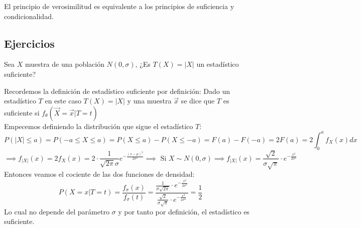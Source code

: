 \begin{teorema}
	El principio de verosimilitud es equivalente a los principios de suficiencia y condicionalidad.
\end{teorema}  

\subsection{Ejercicios}
\begin{problem}{2.1}
	Sea $X$ muestra de una población $N(0, \sigma)$, ¿Es $T(X) = |X|$ un estadístico suficiente?
\end{problem}
\begin{sol}
	Recordemos la definición de estadístico suficiente por definición: Dado un estadístico $T$ en este caso $T(X) = |X|$ y una muestra $\vec{x}$ se dice que $T$ es suficiente si $f_{\theta}(\vec{X} = \vec{x} | T = t)$ \\
	Empecemos definiendo la distribución que sigue el estadístico $T$: 
	$$P(|X| \leq a) = P(-a \leq X \leq a) = P(X \leq a) - P(X \leq -a) = F(a) - F(-a) = 2F(a) = 2\int_{0}^{a}f_{X}(x)dx$$
	$$\implies f_{|X|}(x) = 2f_{X}(x) = 2\cdot \frac{1}{\sqrt{2\pi}\sigma}e^{-\frac{(x - \mu)^2}{2\sigma^2}} \implies \text{ Si } X \sim N(0, \sigma) \implies f_{|X|}(x) = \frac{\sqrt{2}}{\sigma\sqrt{\pi}}\cdot e^{-\frac{x^2}{2\sigma^2}}$$
	Entonces veamos el cociente de las dos funciones de densidad:
	$$P(X = x | T = t) = \frac{f_{\sigma}(x)}{f_{\sigma}(t)} = \frac{\frac{1}{\sigma\sqrt{2\pi}}\cdot e^{-\frac{x^2}{2\sigma^2}}}{\frac{\sqrt{2}}{\sigma\sqrt{\pi}} \cdot e^{-\frac{x^2}{2\sigma^2}}} = \frac{1}{2}$$
	Lo cual no depende del parámetro $\sigma$ y por tanto por definición, el estadístico es suficiente. 
\end{sol}

